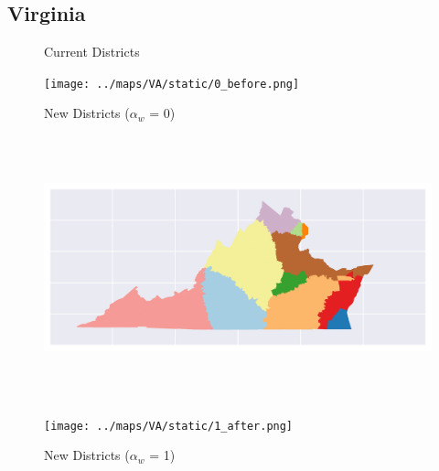 \subsection{Virginia}
\begin{figure}[htb!] \centering
\caption{ Current Districts }
\texttt{[image: ../maps/VA/static/0\_before.png]}
\caption{ New Districts ($\alpha_w$ = 0) }
\includegraphics[width=5in,height=3in,keepaspectratio]{../maps/VA/static/0_after.png}
\caption{ New Districts ($\alpha_w$ = 1) }
\texttt{[image: ../maps/VA/static/1\_after.png]}
\end{figure}

\clearpage
\newpage

